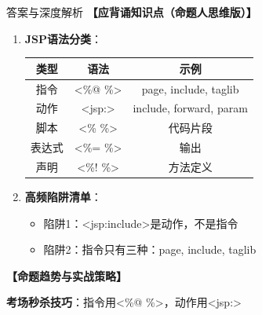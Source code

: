 \documentclass[12pt, a4paper]{ctexart}
\begin{document}
\begin{enumerate}[label=\textbf{\arabic*.}]
\begin{bluebox}{答案与深度解析}
		      \textbf{【应背诵知识点（命题人思维版）】}
		      \begin{enumerate}[leftmargin=*, nosep]
			      \item \textbf{JSP语法分类}：
			            \begin{tabular}{|c|c|c|}
				            \hline
				            \textbf{类型} & \textbf{语法} & \textbf{示例}             \\
				            \hline
				            指令          & <\%@ \%>    & page, include, taglib   \\
				            \hline
				            动作          & <jsp:>      & include, forward, param \\
				            \hline
				            脚本          & <\% \%>     & 代码片段                    \\
				            \hline
				            表达式         & <\%= \%>    & 输出                      \\
				            \hline
				            声明          & <\%! \%>    & 方法定义                    \\
				            \hline
			            \end{tabular}

			      \item \textbf{高频陷阱清单}：
			            \begin{itemize}[label={}, nosep]
				            \item 陷阱1：<jsp:include>是动作，不是指令
				            \item 陷阱2：指令只有三种：page, include, taglib
			            \end{itemize}
		      \end{enumerate}

		      \textbf{【命题趋势与实战策略】}

		      \textbf{考场秒杀技巧}：指令用<\%@ \%>，动作用<jsp:>
	      \end{bluebox}

\end{enumerate}
\end{document}
